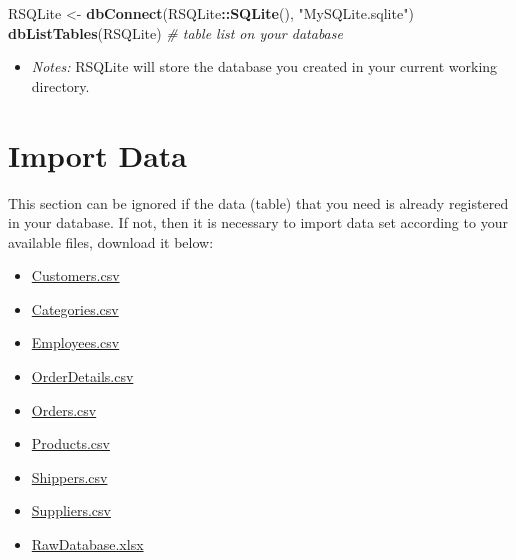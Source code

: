 \documentclass[
]{book}
\newenvironment{Shaded}{\begin{snugshade}}{\end{snugshade}}
\newcommand{\CommentTok}[1]{\textcolor[rgb]{0.56,0.35,0.01}{\textit{#1}}}
\newcommand{\FunctionTok}[1]{\textcolor[rgb]{0.13,0.29,0.53}{\textbf{#1}}}
\newcommand{\NormalTok}[1]{#1}
\newcommand{\OtherTok}[1]{\textcolor[rgb]{0.56,0.35,0.01}{#1}}
\newcommand{\SpecialCharTok}[1]{\textcolor[rgb]{0.81,0.36,0.00}{\textbf{#1}}}
\newcommand{\StringTok}[1]{\textcolor[rgb]{0.31,0.60,0.02}{#1}}
\providecommand{\tightlist}{%
  \setlength{\itemsep}{0pt}\setlength{\parskip}{0pt}}
\begin{document}
\begin{Shaded}
\begin{Highlighting}[]
\NormalTok{RSQLite }\OtherTok{\textless{}{-}} \FunctionTok{dbConnect}\NormalTok{(RSQLite}\SpecialCharTok{::}\FunctionTok{SQLite}\NormalTok{(), }\StringTok{"MySQLite.sqlite"}\NormalTok{)}
\FunctionTok{dbListTables}\NormalTok{(RSQLite)                             }\CommentTok{\# table list on your database}
\end{Highlighting}
\end{Shaded}

\begin{itemize}
\tightlist
\item
  \emph{Notes:} RSQLite will store the database you created in your current working directory.
\end{itemize}

\hypertarget{import-data}{%
\section{Import Data}\label{import-data}}

This section can be ignored if the data (table) that you need is already registered in your database. If not, then it is necessary to import data set according to your available files, download it below:

\begin{itemize}
\tightlist
\item
  \href{https://raw.githubusercontent.com/dsciencelabs/dataset/master/Customers.csv}{Customers.csv}
\item
  \href{https://raw.githubusercontent.com/dsciencelabs/dataset/master/Categories.csv}{Categories.csv}
\item
  \href{https://raw.githubusercontent.com/dsciencelabs/dataset/master/Employees.csv}{Employees.csv}
\item
  \href{https://raw.githubusercontent.com/dsciencelabs/dataset/master/OrderDetails.csv}{OrderDetails.csv}\\
\item
  \href{https://raw.githubusercontent.com/dsciencelabs/dataset/master/Orders.csv}{Orders.csv}
\item
  \href{https://raw.githubusercontent.com/dsciencelabs/dataset/master/Products.csv}{Products.csv}
\item
  \href{https://raw.githubusercontent.com/dsciencelabs/dataset/master/Shippers.csv}{Shippers.csv}
\item
  \href{https://raw.githubusercontent.com/dsciencelabs/dataset/master/Suppliers.csv}{Suppliers.csv}
\item
  \href{https://view.officeapps.live.com/op/view.aspx?src=https\%3A\%2F\%2Fraw.githubusercontent.com\%2Fdsciencelabs\%2Fdataset\%2Fmaster\%2FRawDatabase.xlsx\&wdOrigin=BROWSELINK}{RawDatabase.xlsx}
\end{itemize}
\end{document}
